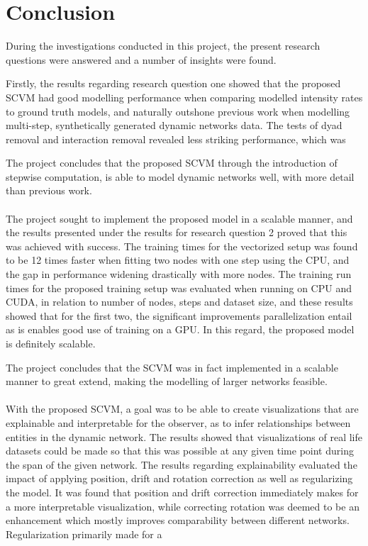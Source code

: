 \section{Conclusion}

During the investigations conducted in this project, the present research questions were answered and a number of insights were found.

Firstly, the results regarding research question one showed that the proposed SCVM had good modelling performance when comparing modelled intensity rates to ground truth models, and naturally outshone previous work when modelling multi-step, synthetically generated dynamic networks data.
The tests of dyad removal and interaction removal revealed less striking performance, which was 

The project concludes that the proposed SCVM through the introduction of stepwise computation, is able to model dynamic networks well, with more detail than previous work.
\\\\
The project sought to implement the proposed model in a scalable manner, and the results presented under the results for research question 2 proved that this was achieved with success.
The training times for the vectorized setup was found to be 12 times faster when fitting two nodes with one step using the CPU, and the gap in performance widening drastically with more nodes.
The training run times for the proposed training setup was evaluated when running on CPU and CUDA, in relation to number of nodes, steps and dataset size, and these results showed that for the first two, the significant improvements parallelization entail as is enables good use of training on a GPU.
In this regard, the proposed model is definitely scalable.

The project concludes that the SCVM was in fact implemented in a scalable manner to great extend, making the modelling of larger networks feasible.
\\\\
With the proposed SCVM, a goal was to be able to create visualizations that are explainable and interpretable for the observer, as to infer relationships between entities in the dynamic network.
The results showed that visualizations of real life datasets could be made so that this was possible at any given time point during the span of the given network.
The results regarding explainability evaluated the impact of applying position, drift and rotation correction as well as regularizing the model.
It was found that position and drift correction immediately makes for a more interpretable visualization, while correcting rotation was deemed to be an enhancement which mostly improves comparability between different networks.
Regularization primarily made for a 

